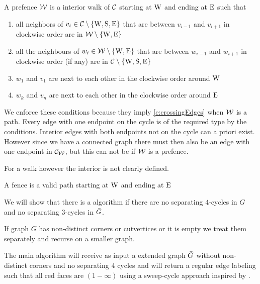 \begin{defi}[prefence]
A prefence $\mathcal{W}$ is a interior walk of $\mathcal{C}$ starting at $\mathrm{W}$ and ending at $\mathrm{E}$ such that
\begin{enumerate}
 \renewcommand*{\labelenumi}{(P\arabic{enumi})}%
 \renewcommand*{\theenumi}{(P\arabic{enumi})}%
  \item  all neighbors of $v_i \in \mathcal{C} \setminus \left\lbrace {\mathrm{W}, \mathrm{S}, \mathrm{E}} \right\rbrace$ that are between $v_{i-1}$ and $v_{i+1}$ in clockwise order are in $\mathcal{W} \setminus \left\lbrace {\mathrm{W}, \mathrm{E}} \right\rbrace$
  \label{p:C}
  \item all the neighbours of $w_i \in \mathcal{W} \setminus \left\lbrace {\mathrm{W}, \mathrm{E}} \right\rbrace$ that are between $w_{i-1}$ and $w_{i+1}$ in clockwise order (if any) are in $\mathcal{C} \setminus \left\lbrace {\mathrm{W}, \mathrm{S}, \mathrm{E}} \right\rbrace$
  \label{p:W}
  \item $w_1$ and $v_1$ are next to each other in the clockwise order around $\mathrm{W}$
  \label{p:pW}
  \item $w_k$ and $v_n$ are next to each other in the clockwise order around  $\mathrm{E}$
  \label{p:pE}
\end{enumerate}
\end{defi}


We enforce these conditions because they imply \ref{e:crossingEdges} when $\mathcal{W}$ is a path. Every edge with one endpoint on the cycle is of the required type by the conditions. Interior edges with both endpoints not on the cycle can a priori exist. However since we have a connected graph there must then also be an edge with  one endpoint in $\mathcal{C}_{\mathcal{W}}$, but this can not be if $\mathcal{W}$ is a prefence.

For a walk however the interior is not clearly defined.

\begin{defi}[fence]
A fence is a valid path starting at $\mathrm{W}$ and ending at $\mathrm{E}$
\end{defi}



We will show that there is a algorithm if there are no separating $4$-cycles in $G$ and no separating $3$-cycles in $\bar{G}$.

If graph $G$ has non-distinct corners or cutvertices or it is empty we treat them separately and recurse on a smaller graph. 


The main algorithm will receive as input a extended graph $\bar{G}$ without non-distinct corners and no separating $4$ cycles and will return a regular edge labeling such that all red faces are $(1-\infty)$ using a sweep-cycle approach inspired by \Fusy {} \cite{Fusy2006}.

